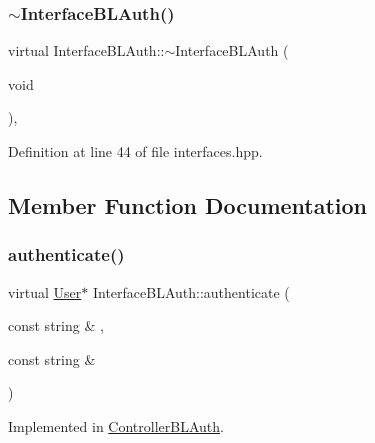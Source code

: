 \subsubsection{\texorpdfstring{$\sim$\+Interface\+B\+L\+Auth()}{~InterfaceBLAuth()}}
{\footnotesize\ttfamily virtual Interface\+B\+L\+Auth\+::$\sim$\+Interface\+B\+L\+Auth (\begin{DoxyParamCaption}\item[{void}]{ }\end{DoxyParamCaption})\hspace{0.3cm}{\ttfamily [inline]}, {\ttfamily [virtual]}}



Definition at line 44 of file interfaces.\+hpp.



\subsection{Member Function Documentation}
\mbox{\label{class_interface_b_l_auth_a326fb6aafafebecbbaf0db346633c996}} 
\subsubsection{\texorpdfstring{authenticate()}{authenticate()}}
{\footnotesize\ttfamily virtual \hyperlink{class_user}{User}$\ast$ Interface\+B\+L\+Auth\+::authenticate (\begin{DoxyParamCaption}\item[{const string \&}]{,  }\item[{const string \&}]{ }\end{DoxyParamCaption})\hspace{0.3cm}{\ttfamily [pure virtual]}}



Implemented in \hyperlink{class_controller_b_l_auth_a0571197328b8100922cefc83a9a96987}{Controller\+B\+L\+Auth}.

\mbox{\label{class_interface_b_l_auth_a738de797493eb2def64b6bf23b911a23}} 
